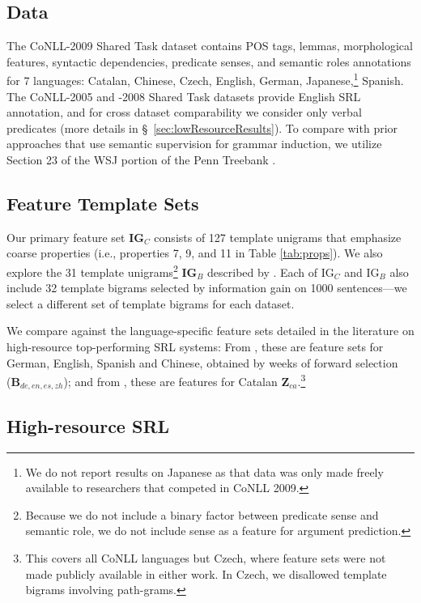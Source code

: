 \documentclass[11pt]{article}
\newcommand{\coarseIgFeats}{\textrm{IG$_{C}$}}
\newcommand{\bjorkIgFeats}{\textrm{IG$_{B}$}}
\newcommand{\bjorkLsFeats}{\textrm{B$_{de,en,es,zh}$}}
\newcommand{\zhaoLsFeats}{\textrm{Z$_{ca}$}}
\newcommand{\prop}[1]{\emph{#1}}
\newcommand{\posi}[1]{{\scriptsize\textsf{#1}}}
\newcommand{\feat}[3]{{\mod{#2}(\posi{#1}).\prop{#3}}}
\renewcommand{\feat}[1]{{\scriptsize\textsf{#1}}}
\begin{document}
\subsection{Data}

The CoNLL-2009 Shared Task \cite{hajivc_conll-2009_2009} dataset
contains POS tags, lemmas, morphological features, syntactic
dependencies, predicate senses, and semantic roles annotations for 7
languages: Catalan, Chinese, Czech, English,
German,
Japanese,\footnote{We do not report results on Japanese as that data
  was only made freely available to researchers that competed in CoNLL
  2009.} Spanish. 
The CoNLL-2005 and -2008 Shared Task datasets provide English SRL
annotation, and for cross dataset comparability we consider only
verbal predicates (more details in \S~\ref{sec:lowResourceResults}). 
To compare with prior approaches that use semantic supervision for
grammar induction, we utilize Section 23 of the WSJ portion of
the Penn Treebank \cite{marcus_building_1993}.

\subsection{Feature Template Sets}
\label{sec:featureSets}
Our primary feature set {\bf \coarseIgFeats{}} consists of 127 template unigrams
that emphasize coarse properties (i.e., properties 7, 9, and 11 in
Table \ref{tab:props}). We also explore the 31
template unigrams\footnote{Because we do not include a binary factor
  between predicate sense and semantic role, we do not include sense
  as a feature for argument prediction.}  {\bf \bjorkIgFeats{}} described by
.  Each of \coarseIgFeats{} and 
\bjorkIgFeats{} also include 32 template bigrams
selected by information gain on 1000 sentences---we select a different set of template
bigrams for each dataset.

We compare against 
the language-specific feature sets detailed in 
the literature on high-resource top-performing SRL systems: 
From , these are feature sets for 
German, English, Spanish and Chinese, obtained by weeks of forward 
selection ({\bf \bjorkLsFeats{}}); 
and from , these are features for Catalan {\bf 
\zhaoLsFeats{}}.\footnote{This covers all CoNLL languages but Czech, 
where feature sets were 
  not made publicly available in either work. In Czech, we disallowed template bigrams
  involving \feat{path-grams}.}

\subsection{High-resource SRL}
\label{sec:highResourceResults}
\end{document}
